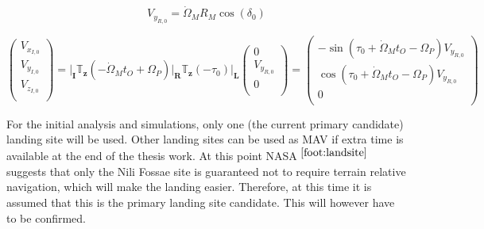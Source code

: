 \begin{equation} \label{eq:init_east_vel_mav}
V_{y_{R,0}}=\dot{\Omega}_{M}R_{M}\cos\left(\delta_{0}\right)
\end{equation}

\begin{equation} \label{eq:init_vel_I_mav}
\begin{pmatrix}
V_{x_{I,0}}\\
V_{y_{I,0}}\\
V_{z_{I,0}}\\
\end{pmatrix}
=
\Bigg|_{\mathbf{I}}\mathbb{T}_{\mathbf{z}}\left(-\dot{\Omega}_{M}t_{O}+\Omega_{P}\right)\Bigg|_{\mathbf{R}}\mathbb{T}_{\mathbf{z}}\left(-\tau_{0}\right)\Bigg|_{\mathbf{L}}
\begin{pmatrix}
0\\
V_{y_{R,0}}\\
0\\
\end{pmatrix}=
\begin{pmatrix}
-\sin\left(\tau_{0}+\dot{\Omega}_{M}t_{O}-\Omega_{P}\right) V_{y_{R,0}}\\
\cos\left(\tau_{0}+\dot{\Omega}_{M}t_{O}-\Omega_{P}\right) V_{y_{R,0}}\\
0\\
\end{pmatrix}
\end{equation}

For the initial analysis and simulations, only one (the current primary candidate) landing site will be used. Other landing sites can be used as \ac{MAV} if extra time is available at the end of the thesis work. At this point NASA $^{\ref{foot:landsite}}$ suggests that only the Nili Fossae site is guaranteed not to require terrain relative navigation, which will make the landing easier. Therefore, at this time it is assumed that this is the primary landing site candidate. This will however have to be confirmed.